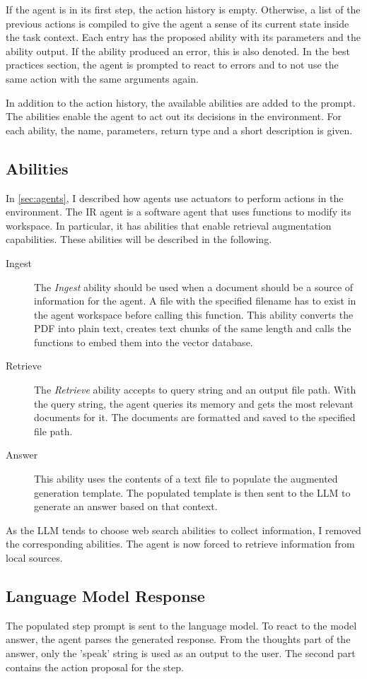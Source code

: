 \documentclass[../main.tex]{subfiles}
\begin{document}
If the agent is in its first step, the action history is empty.
Otherwise, a list of the previous actions is compiled to give the agent a sense of its current state inside the task context.
Each entry has the proposed ability with its parameters and the ability output.
If the ability produced an error, this is also denoted.
In the best practices section, the agent is prompted to react to errors and to not use the same action with the same arguments again.

In addition to the action history, the available abilities are added to the prompt.
The abilities enable the agent to act out its decisions in the environment.
For each ability, the name, parameters, return type and a short description is given.

\subsection{Abilities}

In \autoref{sec:agents}, I described how agents use actuators to perform actions in the environment.
The IR agent is a software agent that uses functions to modify its workspace.
In particular, it has abilities that enable retrieval augmentation capabilities.
These abilities will be described in the following.

\begin{description}
      \item[Ingest] The \emph{Ingest} ability should be used
            when a document should be a source of information for the agent.
            A file with the specified filename has to exist in the agent workspace before calling this function.
            This ability converts the PDF into plain text, creates text chunks of the same length
            and calls the functions to embed them into the vector database.
      \item[Retrieve] The \emph{Retrieve} ability accepts to query string and an output file path.
            With the query string, the agent queries its memory and gets the most relevant documents for it.
            The documents are formatted and saved to the specified file path.
      \item[Answer] This ability uses the contents of a text file to populate the augmented generation template.
            The populated template is then sent to the LLM to generate an answer based on that context.
\end{description}

As the LLM tends to choose web search abilities to collect information, I removed the corresponding abilities.
The agent is now forced to retrieve information from local sources.

\subsection{Language Model Response}

The populated step prompt is sent to the language model.
To react to the model answer, the agent parses the generated response.
From the thoughts part of the answer, only the 'speak' string is used as an output to the user.
The second part contains the action proposal for the step.
\end{document}

